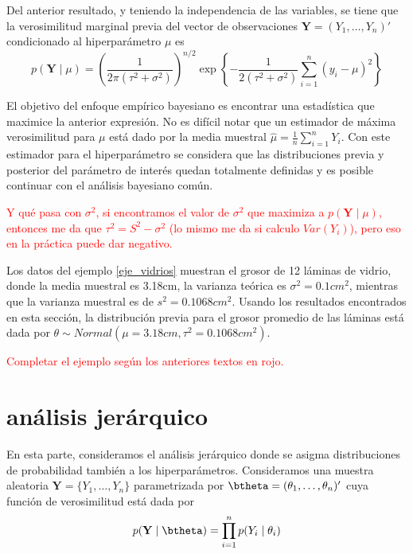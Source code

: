 \documentclass[10pt,openright]{book}\usepackage[]{graphicx}\usepackage[]{color}
\begin{document}
Del anterior resultado, y teniendo la independencia de las variables, se tiene que la verosimilitud marginal previa del vector de observaciones $\mathbf{Y}=(Y_1,\ldots,Y_n)'$ condicionado al hiperpar\'ametro $\mu$ es
\begin{equation*}
p(\mathbf{Y} \mid \mu)=\left(\frac{1}{2\pi(\tau^2+\sigma^2)}\right)^{n/2}
\exp\left\{-\frac{1}{2(\tau^2+\sigma^2)}\sum_{i=1}^n\left(y_i-\mu\right)^2\right\}
\end{equation*}

El objetivo del enfoque emp\'irico bayesiano es encontrar una estad\'istica que maximice la anterior expresi\'on. No es dif\'icil notar que un estimador de m\'axima verosimilitud para $\mu$ est\'a dado por la media muestral $\hat{\mu}=\frac{1}{n}\sum_{i=1}^n Y_i$. Con este estimador para el hiperpar\'ametro se considera que las distribuciones previa y posterior del par\'ametro de inter\'es quedan totalmente definidas y es posible continuar con el an\'alisis bayesiano com\'un.

\textcolor{red}{Y qu\'e pasa con $\sigma^2$, si encontramos el valor de $\sigma^2$ que maximiza a $p(\mathbf{Y}\mid\mu)$, entonces me da que $\tau^2=S^2-\sigma^2$ (lo mismo me da si calculo $Var(Y_i)$), pero eso en la pr\'actica puede dar negativo.}

\begin{Eje}
Los datos del ejemplo \ref{eje_vidrios} muestran el grosor de 12 l\'aminas de vidrio, donde la media muestral es 3.18cm, la varianza te\'orica es $\sigma^2=0.1cm^2$, mientras que la varianza muestral es de $s^2=0.1068cm^2$. Usando los resultados encontrados en esta secci\'on, la distribuci\'on previa para el grosor promedio de las l\'aminas est\'a dada por $\theta\sim Normal(\mu=3.18cm,\tau^2=0.1068cm^2)$. 

\textcolor{red}{Completar el ejemplo seg\'un los anteriores textos en rojo.}
\end{Eje}

\section{an\'alisis jer\'arquico}
En esta parte, consideramos el an\'alisis jer\'arquico donde se asigma distribuciones de probabilidad tambi\'en a los hiperpar\'ametros. Consideramos una muestra aleatoria $\mathbf{Y}=\{Y_1,\ldots,Y_n\}$ parametrizada por $\btheta=(\theta_1,\ldots,\theta_n)'$ cuya funci\'on de verosimilitud est\'a dada por
\begin{equation}
p(\mathbf{Y} \mid \btheta)=\prod_{i=1}^n p(Y_i \mid \theta_i)
\end{equation}
\end{document}
